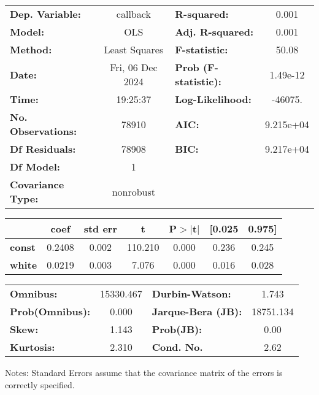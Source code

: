 \begin{center}
\begin{tabular}{lclc}
\toprule
\textbf{Dep. Variable:}    &     callback     & \textbf{  R-squared:         } &     0.001   \\
\textbf{Model:}            &       OLS        & \textbf{  Adj. R-squared:    } &     0.001   \\
\textbf{Method:}           &  Least Squares   & \textbf{  F-statistic:       } &     50.08   \\
\textbf{Date:}             & Fri, 06 Dec 2024 & \textbf{  Prob (F-statistic):} &  1.49e-12   \\
\textbf{Time:}             &     19:25:37     & \textbf{  Log-Likelihood:    } &   -46075.   \\
\textbf{No. Observations:} &       78910      & \textbf{  AIC:               } & 9.215e+04   \\
\textbf{Df Residuals:}     &       78908      & \textbf{  BIC:               } & 9.217e+04   \\
\textbf{Df Model:}         &           1      & \textbf{                     } &             \\
\textbf{Covariance Type:}  &    nonrobust     & \textbf{                     } &             \\
\bottomrule
\end{tabular}
\begin{tabular}{lcccccc}
               & \textbf{coef} & \textbf{std err} & \textbf{t} & \textbf{P$> |$t$|$} & \textbf{[0.025} & \textbf{0.975]}  \\
\midrule
\textbf{const} &       0.2408  &        0.002     &   110.210  &         0.000        &        0.236    &        0.245     \\
\textbf{white} &       0.0219  &        0.003     &     7.076  &         0.000        &        0.016    &        0.028     \\
\bottomrule
\end{tabular}
\begin{tabular}{lclc}
\textbf{Omnibus:}       & 15330.467 & \textbf{  Durbin-Watson:     } &     1.743  \\
\textbf{Prob(Omnibus):} &    0.000  & \textbf{  Jarque-Bera (JB):  } & 18751.134  \\
\textbf{Skew:}          &    1.143  & \textbf{  Prob(JB):          } &      0.00  \\
\textbf{Kurtosis:}      &    2.310  & \textbf{  Cond. No.          } &      2.62  \\
\bottomrule
\end{tabular}
\end{center}

Notes: \newline
 [1] Standard Errors assume that the covariance matrix of the errors is correctly specified.